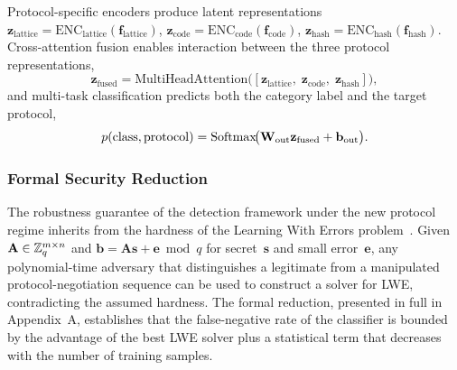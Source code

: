Protocol-specific encoders produce latent representations $\mathbf{z}_{\mathrm{lattice}}=\mathrm{ENC}_{\mathrm{lattice}}(\mathbf{f}_{\mathrm{lattice}})$, $\mathbf{z}_{\mathrm{code}}=\mathrm{ENC}_{\mathrm{code}}(\mathbf{f}_{\mathrm{code}})$, $\mathbf{z}_{\mathrm{hash}}=\mathrm{ENC}_{\mathrm{hash}}(\mathbf{f}_{\mathrm{hash}})$. Cross-attention fusion enables interaction between the three protocol representations,
\begin{equation}
\mathbf{z}_{\mathrm{fused}}
= \mathrm{MultiHeadAttention}\!\bigl(
  [\mathbf{z}_{\mathrm{lattice}},\;
   \mathbf{z}_{\mathrm{code}},\;
   \mathbf{z}_{\mathrm{hash}}]\bigr),
\label{eq:pq_fusion}
\end{equation}and multi-task classification predicts both the category label and the target protocol,\begin{equation}
p(\mathrm{class},\mathrm{protocol})
= \mathrm{Softmax}\!\bigl(\mathbf{W}_{\mathrm{out}}\mathbf{z}_{\mathrm{fused}}
  + \mathbf{b}_{\mathrm{out}}\bigr).
\label{eq:pq_class}
\end{equation}

\subsubsection{Formal Security Reduction}

The robustness guarantee of the detection framework under the new protocol regime inherits from the hardness of the Learning With Errors problem~\cite{Regev2009,Peikert2016}. Given $\mathbf{A}\in\mathbb{Z}_q^{m\times n}$ and $\mathbf{b}=\mathbf{A}\mathbf{s}+\mathbf{e}\bmod q$ for secret~$\mathbf{s}$ and small error~$\mathbf{e}$, any polynomial-time adversary that distinguishes a legitimate from a manipulated protocol-negotiation sequence can be used to construct a solver for LWE, contradicting the assumed hardness. The formal reduction, presented in full in Appendix~A, establishes that the false-negative rate of the classifier is bounded by the advantage of the best LWE solver plus a statistical term that decreases with the number of training samples.

